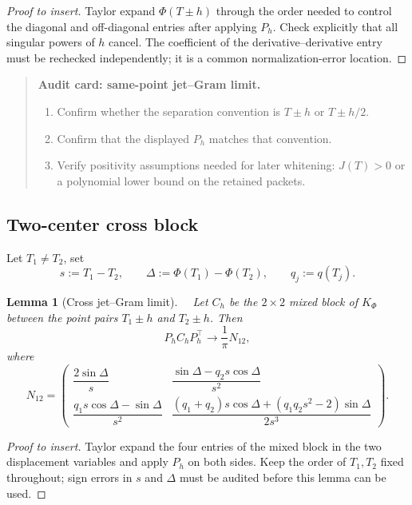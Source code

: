 \documentclass[11pt,a4paper]{amsart}
\newcommand{\Status}[1]{\textnormal{\fbox{\scriptsize\textsf{#1}}}}
\newcommand{\Core}{\Status{CORE}}
\newcommand{\Open}{\Status{OPEN}}
\newcommand{\Ph}{\Phi}
\theoremstyle{plain}
\newtheorem{lemma}[theorem]{Lemma}
\theoremstyle{definition}
\newenvironment{audit}[1]{%
  \begin{quote}\noindent\textbf{Audit card: #1.}\par\smallskip\small
}{\end{quote}}
\begin{document}
\begin{proof}[Proof to insert]
Taylor expand \(\Ph(T\pm h)\) through the order needed to control the diagonal and off-diagonal entries after applying \(P_h\).  Check explicitly that all singular powers of \(h\) cancel.  The coefficient of the derivative--derivative entry must be rechecked independently; it is a common normalization-error location.
\end{proof}

\begin{audit}{same-point jet--Gram limit}
\begin{enumerate}[label=\textup{A\arabic*.},leftmargin=*]
\item Confirm whether the separation convention is \(T\pm h\) or \(T\pm h/2\).
\item Confirm that the displayed \(P_h\) matches that convention.
\item Verify positivity assumptions needed for later whitening: \(J(T)>0\) or a polynomial lower bound on the retained packets.
\end{enumerate}
\end{audit}

\subsection{Two-center cross block}
\label{subsec:two-center-cross-block}

Let \(T_1\ne T_2\), set
\[
        s:=T_1-T_2,
        \qquad
        \Delta:=\Ph(T_1)-\Ph(T_2),
        \qquad
        q_j:=q(T_j).
\]

\begin{lemma}[Cross jet--Gram limit]
\label{lem:cross-jetgram-limit}
\Core\ \Open\
Let \(C_h\) be the \(2\times2\) mixed block of \(K_\Ph\) between the point pairs \(T_1\pm h\) and \(T_2\pm h\).  Then
\[
        P_hC_hP_h^\top\longrightarrow \frac1\pi N_{12},
\]
where
\begin{equation}
\label{eq:cross-N12}
N_{12}=
\begin{pmatrix}
\dfrac{2\sin \Delta}{s}
&
\dfrac{\sin \Delta-q_2s\cos \Delta}{s^2}
\\[2ex]
\dfrac{q_1s\cos \Delta-\sin \Delta}{s^2}
&
\dfrac{(q_1+q_2)s\cos \Delta+(q_1q_2s^2-2)\sin \Delta}{2s^3}
\end{pmatrix}.
\end{equation}
\end{lemma}

\begin{proof}[Proof to insert]
Taylor expand the four entries of the mixed block in the two displacement variables and apply \(P_h\) on both sides.  Keep the order of \(T_1,T_2\) fixed throughout; sign errors in \(s\) and \(\Delta\) must be audited before this lemma can be used.
\end{proof}
\end{document}
